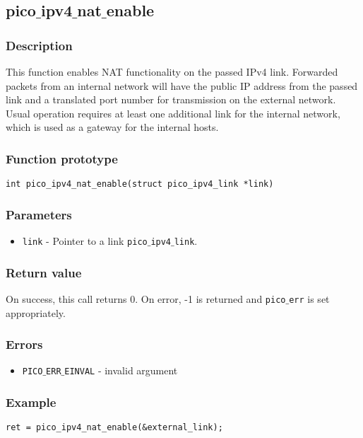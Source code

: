 \subsection{pico$\_$ipv4$\_$nat$\_$enable}

\subsubsection*{Description}
This function enables NAT functionality on the passed IPv4 link.
Forwarded packets from an internal network will have the public IP address from the passed link
and a translated port number for transmission on the external network.
Usual operation requires at least one additional link for the internal network,
which is used as a gateway for the internal hosts.

\subsubsection*{Function prototype}
\begin{verbatim}
int pico_ipv4_nat_enable(struct pico_ipv4_link *link)
\end{verbatim}

\subsubsection*{Parameters}
\begin{itemize}[noitemsep]
\item \texttt{link} - Pointer to a link \texttt{pico$\_$ipv4$\_$link}.
\end{itemize}

\subsubsection*{Return value}
On success, this call returns 0.
On error, -1 is returned and \texttt{pico$\_$err} is set appropriately.

\subsubsection*{Errors}
\begin{itemize}[noitemsep]
\item \texttt{PICO$\_$ERR$\_$EINVAL} - invalid argument
\end{itemize}

\subsubsection*{Example}
\begin{verbatim}
ret = pico_ipv4_nat_enable(&external_link);
\end{verbatim}



